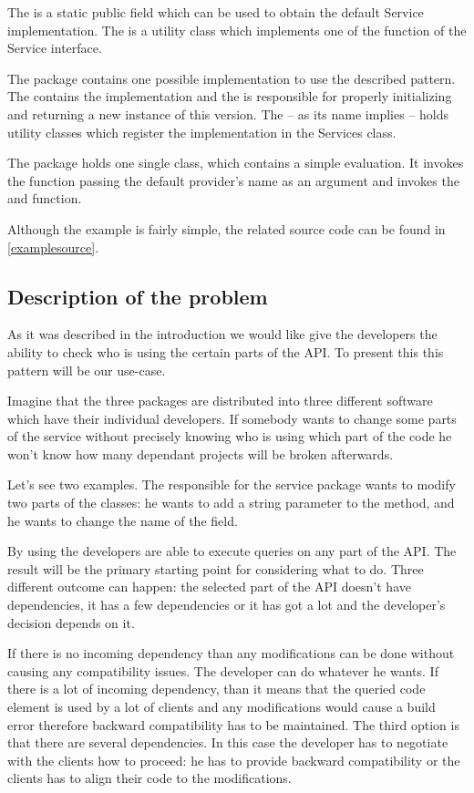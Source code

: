 The  is a static public field which can be used to
obtain the default Service implementation. The  is a
utility class which implements one of the function of the Service interface.

The  package contains one possible implementation to use the
described pattern. The  contains the implementation and the
 is responsible for properly initializing and returning a
new instance of this version. The  -- as its name implies --
holds utility classes which register the implementation in the Services class.

The  package holds one single  class, which contains a
simple evaluation. It invokes the  function passing
the default provider's name as an argument and invokes the  and
 function.

Although the example is fairly simple, the related source code can be found in
\autoref{examplesource}.

\subsection{Description of the problem}
As it was described in the introduction we would like give the developers the
ability to check who is using the certain parts of the API. To present this this
pattern will be our use-case.

Imagine that the three packages are distributed into three different software
which have their individual developers. If somebody wants to change some parts
of the service without precisely knowing who is using which part of the code he
won't know how many dependant projects will be broken afterwards.

Let's see two examples. The responsible for the service package wants to modify
two parts of the classes: he wants to add a string parameter to the
 method, and he wants to change the name of the
 field. 

By using \ptool{} the developers are able to execute queries on any part of the
API. The result will be the primary starting point for considering what to do.
Three different outcome can happen: the selected part of the API doesn't have
dependencies, it has a few dependencies or it has got a lot and the developer's
decision depends on it. 

If there is no incoming dependency than any modifications can be done without
causing any compatibility issues. The developer can do whatever he wants.
If there is a lot of incoming dependency, than it means that the queried code
element is used by a lot of clients and any modifications would cause a build
error therefore backward compatibility has to be maintained. The third option is
that there are several dependencies. In this case the developer has to negotiate
with the clients how to proceed: he has to provide backward compatibility or the
clients has to align their code to the modifications.


